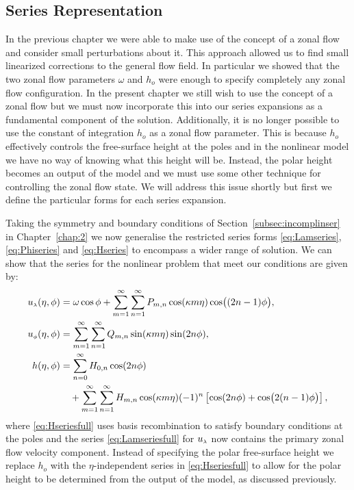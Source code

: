 \subsection{Series Representation} 
In the previous chapter we were able to make use of the concept of a zonal flow and consider small perturbations about it. This approach allowed us to find small linearized corrections to the general flow field. In particular we showed that the two zonal flow parameters $\omega$ and $h_o$ were enough to specify completely any zonal flow configuration. In the present chapter we still wish to use the concept of a zonal flow but we must now incorporate this into our series expansions as a fundamental component of the solution. Additionally, it is no longer possible to use the constant of integration $h_o$ as a zonal flow parameter. This is because $h_o$ effectively controls the free-surface height at the poles and in the nonlinear model we have no way of knowing what this height will be. Instead, the polar height becomes an output of the model and we must use some other technique for controlling the zonal flow state. We will address this issue shortly but first we define the particular forms for each series expansion.

Taking the symmetry and boundary conditions of Section~\ref{subsec:incomplinser} in Chapter~\ref{chap:2} we now generalise the restricted series forms \eqref{eq:Lamseries}, \eqref{eq:Phiseries} and \eqref{eq:Hseries} to encompass a wider range of solution. We can show that the series for the nonlinear problem that meet our conditions are given by:
\begin{align}
{\ensuremath{u_{\scriptscriptstyle \lambda}}}(\eta,\phi) &= \omega\cos\phi+\sum_{m=1}^\infty \sum_{n=1}^\infty P_{m,n}\cos(\kappa m \eta) \cos\bigl((2n-1)\phi\bigr), \label{eq:Lamseriesfull}\\
{u_{\scriptscriptstyle \phi}}(\eta,\phi) &= \sum_{m=1}^\infty \sum_{n=1}^\infty Q_{m,n}\sin(\kappa m \eta) \sin(2n\phi), \label{eq:Phiseriesfull}\\
h(\eta,\phi) &= \sum_{n=0}^\infty H_{0,n}\cos(2 n \phi) \notag \\
&\quad+\sum_{m=1}^\infty \sum_{n=1}^\infty H_{m,n} \cos(\kappa m \eta) (-1)^n \left[ \cos(2n\phi)+\cos\bigl(2(n-1)\phi\bigr) \right], \label{eq:Hseriesfull}
\end{align}
where \eqref{eq:Hseriesfull} uses basis recombination to satisfy boundary conditions at the poles and the series \eqref{eq:Lamseriesfull} for ${u_{\scriptscriptstyle \lambda}}$ now contains the primary zonal flow velocity component. Instead of specifying the polar free-surface height we replace $h_o$ with the $\eta$-independent series in \eqref{eq:Hseriesfull} to allow for the polar height to be determined from the output of the model, as discussed previously.

